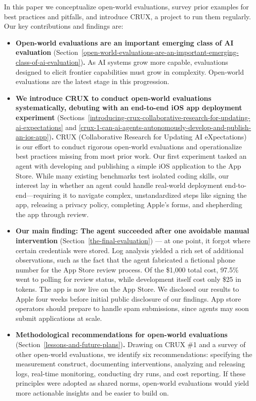 \documentclass{article}
\newcounter{recommendation}
\begin{document}
In this paper we conceptualize open-world evaluations, survey prior examples for best practices and pitfalls, and introduce CRUX, a project to run them regularly. Our key contributions and findings are:

\begin{itemize}[leftmargin=9pt, topsep=-3pt, itemsep=3pt, parsep=0pt]
\item
 \textbf{Open-world evaluations are an important emerging class of AI evaluation} (Section~\ref{open-world-evaluations-are-an-important-emerging-class-of-ai-evaluation}){\textbf{.}} As AI systems grow more capable, evaluations designed to elicit frontier capabilities must grow in complexity. Open-world evaluations are the latest stage in this progression.
\item
 \textbf{We introduce CRUX to conduct open-world evaluations systematically, debuting with an end-to-end iOS app deployment experiment} (Sections~\ref{introducing-crux-collaborative-research-for-updating-ai-expectations} and \ref{crux-1-can-ai-agents-autonomously-develop-and-publish-an-ios-app}){\textbf{.}}
 CRUX (Collaborative Research for Updating AI eXpectations) is our effort to conduct rigorous open-world evaluations and operationalize best practices missing from most prior work. Our first experiment tasked an agent with developing and publishing a simple iOS application to the App Store. While many existing benchmarks test isolated coding skills, our interest lay in whether an agent could handle real-world deployment end-to-end—requiring it to navigate complex, unstandardized steps like signing the app, releasing a privacy policy, completing Apple's forms, and shepherding the app through review.
\item
 \textbf{Our main finding: The agent succeeded after one avoidable manual intervention} (Section~\ref{the-final-evaluation}) --- at one point, it forgot where certain credentials were stored. Log analysis yielded a rich set of additional observations, such as the fact that the agent fabricated a fictional phone number for the App Store review process. Of the \$1{,}000 total cost, 97.5\% went to polling for review status, while development itself cost only \$25 in tokens. The app is now live on the App Store. We disclosed our results to Apple four weeks before initial public disclosure of our findings. App store operators should prepare to handle spam submissions, since agents may soon submit applications at scale.
\item
 \textbf{Methodological recommendations for open-world evaluations} (Section~\ref{lessons-and-future-plans}){\textbf{.}} Drawing on CRUX \#1 and a survey of other open-world evaluations, we identify six recommendations: specifying the measurement construct, documenting interventions, analyzing and releasing logs, real-time monitoring, conducting dry runs, and cost reporting. If these principles were adopted as shared norms, open-world evaluations would yield more actionable insights and be easier to build on.
\end{itemize}
\end{document}
